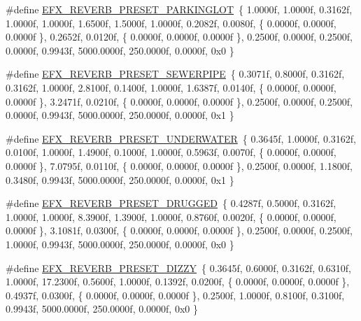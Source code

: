 \begin{DoxyCompactItemize}
\#define \mbox{\hyperlink{efx-presets_8h_a92af074540f1cef1a1831574abd23511}{E\+F\+X\+\_\+\+R\+E\+V\+E\+R\+B\+\_\+\+P\+R\+E\+S\+E\+T\+\_\+\+P\+A\+R\+K\+I\+N\+G\+L\+OT}}~\{ 1.\+0000f, 1.\+0000f, 0.\+3162f, 1.\+0000f, 1.\+0000f, 1.\+6500f, 1.\+5000f, 1.\+0000f, 0.\+2082f, 0.\+0080f, \{ 0.\+0000f, 0.\+0000f, 0.\+0000f \}, 0.\+2652f, 0.\+0120f, \{ 0.\+0000f, 0.\+0000f, 0.\+0000f \}, 0.\+2500f, 0.\+0000f, 0.\+2500f, 0.\+0000f, 0.\+9943f, 5000.\+0000f, 250.\+0000f, 0.\+0000f, 0x0 \}
\item 
\#define \mbox{\hyperlink{efx-presets_8h_a51a0c280deb8768e50ec99bb8afd00f7}{E\+F\+X\+\_\+\+R\+E\+V\+E\+R\+B\+\_\+\+P\+R\+E\+S\+E\+T\+\_\+\+S\+E\+W\+E\+R\+P\+I\+PE}}~\{ 0.\+3071f, 0.\+8000f, 0.\+3162f, 0.\+3162f, 1.\+0000f, 2.\+8100f, 0.\+1400f, 1.\+0000f, 1.\+6387f, 0.\+0140f, \{ 0.\+0000f, 0.\+0000f, 0.\+0000f \}, 3.\+2471f, 0.\+0210f, \{ 0.\+0000f, 0.\+0000f, 0.\+0000f \}, 0.\+2500f, 0.\+0000f, 0.\+2500f, 0.\+0000f, 0.\+9943f, 5000.\+0000f, 250.\+0000f, 0.\+0000f, 0x1 \}
\item 
\#define \mbox{\hyperlink{efx-presets_8h_a507d85d1c0b55bb3ba82360f48e50506}{E\+F\+X\+\_\+\+R\+E\+V\+E\+R\+B\+\_\+\+P\+R\+E\+S\+E\+T\+\_\+\+U\+N\+D\+E\+R\+W\+A\+T\+ER}}~\{ 0.\+3645f, 1.\+0000f, 0.\+3162f, 0.\+0100f, 1.\+0000f, 1.\+4900f, 0.\+1000f, 1.\+0000f, 0.\+5963f, 0.\+0070f, \{ 0.\+0000f, 0.\+0000f, 0.\+0000f \}, 7.\+0795f, 0.\+0110f, \{ 0.\+0000f, 0.\+0000f, 0.\+0000f \}, 0.\+2500f, 0.\+0000f, 1.\+1800f, 0.\+3480f, 0.\+9943f, 5000.\+0000f, 250.\+0000f, 0.\+0000f, 0x1 \}
\item 
\#define \mbox{\hyperlink{efx-presets_8h_a45a589369c56c50c8e4017caafae954d}{E\+F\+X\+\_\+\+R\+E\+V\+E\+R\+B\+\_\+\+P\+R\+E\+S\+E\+T\+\_\+\+D\+R\+U\+G\+G\+ED}}~\{ 0.\+4287f, 0.\+5000f, 0.\+3162f, 1.\+0000f, 1.\+0000f, 8.\+3900f, 1.\+3900f, 1.\+0000f, 0.\+8760f, 0.\+0020f, \{ 0.\+0000f, 0.\+0000f, 0.\+0000f \}, 3.\+1081f, 0.\+0300f, \{ 0.\+0000f, 0.\+0000f, 0.\+0000f \}, 0.\+2500f, 0.\+0000f, 0.\+2500f, 1.\+0000f, 0.\+9943f, 5000.\+0000f, 250.\+0000f, 0.\+0000f, 0x0 \}
\item 
\#define \mbox{\hyperlink{efx-presets_8h_afae1b7284621db910ef4f29390640cd8}{E\+F\+X\+\_\+\+R\+E\+V\+E\+R\+B\+\_\+\+P\+R\+E\+S\+E\+T\+\_\+\+D\+I\+Z\+ZY}}~\{ 0.\+3645f, 0.\+6000f, 0.\+3162f, 0.\+6310f, 1.\+0000f, 17.\+2300f, 0.\+5600f, 1.\+0000f, 0.\+1392f, 0.\+0200f, \{ 0.\+0000f, 0.\+0000f, 0.\+0000f \}, 0.\+4937f, 0.\+0300f, \{ 0.\+0000f, 0.\+0000f, 0.\+0000f \}, 0.\+2500f, 1.\+0000f, 0.\+8100f, 0.\+3100f, 0.\+9943f, 5000.\+0000f, 250.\+0000f, 0.\+0000f, 0x0 \}
\item 

\end{DoxyCompactItemize}

